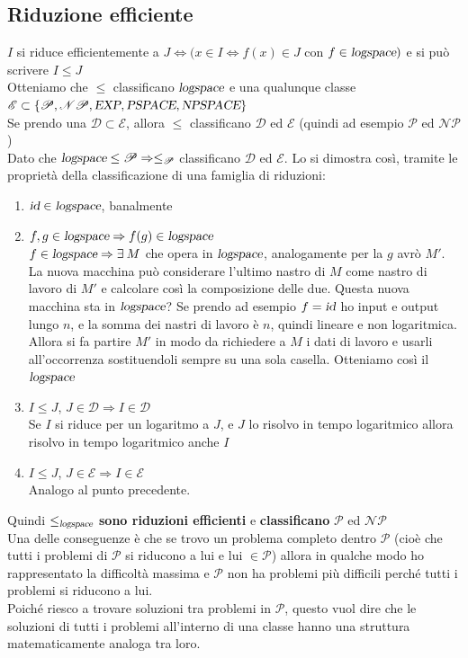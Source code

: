 \documentclass[10pt]{book}
\begin{document}
\subsection{Riduzione efficiente}
$I$ si riduce efficientemente a $J \Leftrightarrow (x\in I \Leftrightarrow f(x)\in J$ con $f \in \textsl{logspace})$ e si può scrivere $I \leq J$\\
Otteniamo che $\leq$ classificano $\textsl{logspace}$ e una qualunque classe $\mathscr{E} \subset \{\mathscr{P}, \mathscr{NP}, \textsl{EXP}, \textsl{PSPACE}, \textsl{NPSPACE}\}$\\
Se prendo una $\mathscr{D} \subset \mathscr{E}$, allora $\leq$ classificano $\mathscr{D}$ ed $\mathscr{E}$ (quindi ad esempio $\mathscr{P}$ ed $\mathscr{NP}$)\\
Dato che $\textsl{logspace}\leq\mathscr{P} \Rightarrow \leq_\mathscr{P}$ classificano $\mathscr{D}$ ed $\mathscr{E}$. Lo si dimostra così, tramite le proprietà della classificazione di una famiglia di riduzioni:
\begin{enumerate}
	\item $\textsl{id} \in \textsl{logspace}$, banalmente
	\item $f, g \in \textsl{logspace} \Rightarrow f(g)\in \textsl{logspace}$\\
	$f \in \textsl{logspace} \Rightarrow \exists\:M$ che opera in $\textsl{logspace}$, analogamente per la $g$ avrò $M'$. La nuova macchina può considerare l'ultimo nastro di $M$ come nastro di lavoro di $M'$ e calcolare così la composizione delle due. Questa nuova macchina sta in $\textsl{logspace}$? Se prendo ad esempio $f = \textsl{id}$ ho input e output lungo $n$, e la somma dei nastri di lavoro è $n$, quindi lineare e non logaritmica. Allora si fa partire $M'$ in modo da richiedere a $M$ i dati di lavoro e usarli all'occorrenza sostituendoli sempre su una sola casella. Otteniamo così il $\textsl{logspace}$
	\item $I\leq J$, $J \in \mathscr{D} \Rightarrow I \in \mathscr{D}$\\
	Se $I$ si riduce per un logaritmo a $J$, e $J$ lo risolvo in tempo logaritmico allora risolvo in tempo logaritmico anche $I$
	\item $I\leq J$, $J \in \mathscr{E} \Rightarrow I \in \mathscr{E}$\\
	Analogo al punto precedente.
\end{enumerate}
Quindi $\leq_{\textsl{logspace}}$ \textbf{sono riduzioni efficienti} e \textbf{classificano} $\mathscr{P}$ ed $\mathscr{NP}$\\
Una delle conseguenze è che se trovo un problema completo dentro $\mathscr{P}$ (cioè che tutti i problemi di $\mathscr{P}$ si riducono a lui e lui $\in\mathscr{P}$) allora in qualche modo ho rappresentato la difficoltà massima e $\mathscr{P}$ non ha problemi più difficili perché tutti i problemi si riducono a lui.\\
Poiché riesco a trovare soluzioni tra problemi in $\mathscr{P}$, questo vuol dire che le soluzioni di tutti i problemi all'interno di una classe hanno una struttura matematicamente analoga tra loro.
\end{document}
